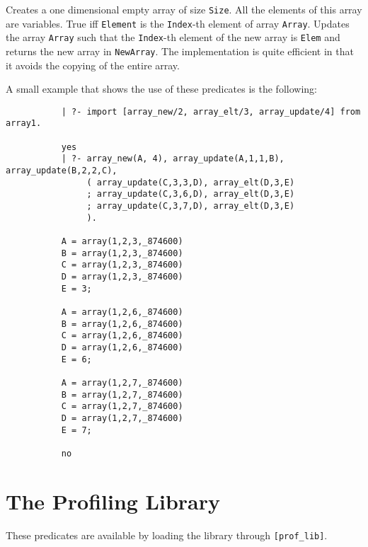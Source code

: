 \begin{description}
    Creates a one dimensional empty array of size {\tt Size}.  All the 
    elements of this array are variables.
    True iff {\tt Element} is the {\tt Index}-th element of array 
    {\tt Array}.
    Updates the array {\tt Array} such that the {\tt Index}-th element
    of the new array is {\tt Elem} and returns the new array in 
    {\tt NewArray}.  The implementation is quite efficient in that it 
    avoids the copying of the entire array.
\end{description}

A small example that shows the use of these predicates is the following:
{\footnotesize
 \begin{verbatim}
           | ?- import [array_new/2, array_elt/3, array_update/4] from array1.

           yes
           | ?- array_new(A, 4), array_update(A,1,1,B), array_update(B,2,2,C),
                ( array_update(C,3,3,D), array_elt(D,3,E)
                ; array_update(C,3,6,D), array_elt(D,3,E)
                ; array_update(C,3,7,D), array_elt(D,3,E)
                ).

           A = array(1,2,3,_874600)
           B = array(1,2,3,_874600)
           C = array(1,2,3,_874600)
           D = array(1,2,3,_874600)
           E = 3;

           A = array(1,2,6,_874600)
           B = array(1,2,6,_874600)
           C = array(1,2,6,_874600)
           D = array(1,2,6,_874600)
           E = 6;

           A = array(1,2,7,_874600)
           B = array(1,2,7,_874600)
           C = array(1,2,7,_874600)
           D = array(1,2,7,_874600)
           E = 7;

           no
 \end{verbatim}
}


\section{The Profiling Library}

These predicates are available by loading the library through
{\tt [prof\_lib]}.


